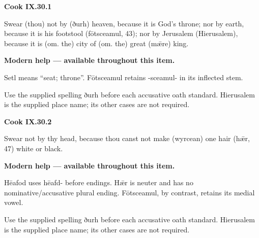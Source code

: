 \par\begin{minipage}{\linewidth}\raggedright
\textbf{Cook IX.30.1}

Swear (thou) not by (ðurh) heaven, because it is God’s throne; nor by earth, because it is his footstool (fōtsceamul, 43); nor by Jerusalem (Hierusalem), because it is (om. the) city of (om. the) great (mǣre) king.

\textbf{Modern help — available throughout this item.}

\end{minipage}\par\addvspace{4pt}

Setl means “seat; throne”. Fōtsceamul retains -sceamul- in its inflected stem.

Use the supplied spelling ðurh before each accusative oath standard. Hierusalem is the supplied place name; its other cases are not required.

\par\begin{minipage}{\linewidth}\raggedright
\textbf{Cook IX.30.2}

Swear not by thy head, because thou canst not make (wyrcean) one hair (hǣr, 47) white or black.

\textbf{Modern help — available throughout this item.}

\end{minipage}\par\addvspace{4pt}

Hēafod uses hēafd- before endings. Hǣr is neuter and has no nominative/\allowbreak{}accusative plural ending. Fōtsceamul, by contrast, retains its medial vowel.

Use the supplied spelling ðurh before each accusative oath standard. Hierusalem is the supplied place name; its other cases are not required.

